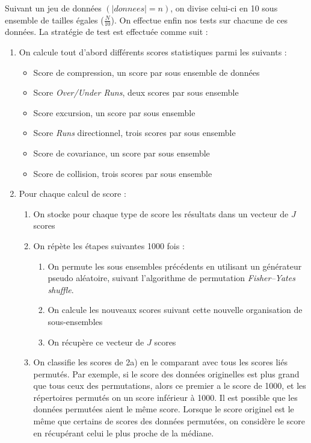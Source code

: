 Suivant un jeu de données $(|donnees|=n)$, on divise celui-ci en 10 sous ensemble de tailles égales ($\frac{N}{10}$). On effectue enfin nos tests sur chacune de ces données. La stratégie de test est effectuée comme suit : 
\begin{enumerate}
\item On calcule tout d'abord différents scores statistiques parmi les suivants :
	\begin{itemize}
	\item Score de compression, un score par sous ensemble de données
	\item Score \textit{Over/Under Runs}, deux scores par sous ensemble
	\item Score excursion, un score par sous ensemble
	\item Score \textit{Runs} directionnel, trois scores par sous ensemble
	\item Score de covariance, un score par sous ensemble 
	\item Score de collision, trois scores par sous ensemble\\
	\end{itemize}
	
\item Pour chaque calcul de score : 
	\begin{enumerate}
	\item On stocke pour chaque type de score les résultats dans un vecteur de $J$ scores
	\item On répète les étapes suivantes 1000 fois :
		\begin{enumerate}
		\item On permute les sous ensembles précédents en utilisant un générateur pseudo aléatoire, suivant l'algorithme de permutation  \textit{Fisher–Yates shuffle}. 
		\item On calcule les nouveaux scores suivant cette nouvelle organisation de sous-ensembles
		\item On récupère ce vecteur de $J$ scores
		\end{enumerate}
	\item On classifie les scores de 2a) en le comparant avec tous les scores liés permutés. Par exemple, si le score des données originelles est plus grand que tous ceux des permutations, alors ce premier a le score de 1000, et les répertoires permutés on un score inférieur à 1000. Il est possible que les données permutées aient le même score. Lorsque le score originel est le même que certains de scores des données permutées, on considère le score en récupérant celui le plus proche de la médiane. \\
	

\end{enumerate}
\end{enumerate}
